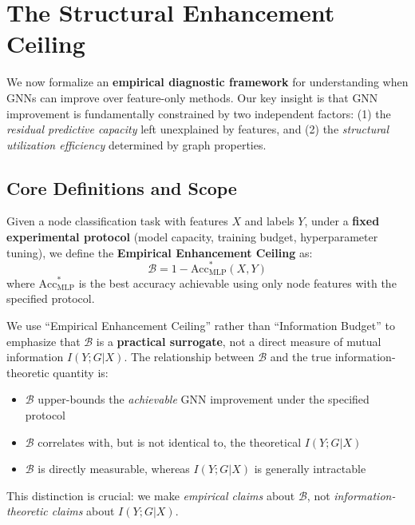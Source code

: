 
\section{The Structural Enhancement Ceiling}
\label{sec:budget}

We now formalize an \textbf{empirical diagnostic framework} for understanding when GNNs can improve over feature-only methods. Our key insight is that GNN improvement is fundamentally constrained by two independent factors: (1) the \textit{residual predictive capacity} left unexplained by features, and (2) the \textit{structural utilization efficiency} determined by graph properties.

\subsection{Core Definitions and Scope}

\begin{definition}
\label{def:budget}
Given a node classification task with features $X$ and labels $Y$, under a \textbf{fixed experimental protocol} (model capacity, training budget, hyperparameter tuning), we define the \textbf{Empirical Enhancement Ceiling} as:
\begin{equation}
    \mathcal{B} = 1 - \text{Acc}_{\text{MLP}}^*(X, Y)
\end{equation}
where $\text{Acc}_{\text{MLP}}^*$ is the best accuracy achievable using only node features with the specified protocol.
\end{definition}

\begin{remark}
\label{rem:terminology}
We use ``Empirical Enhancement Ceiling'' rather than ``Information Budget'' to emphasize that $\mathcal{B}$ is a \textbf{practical surrogate}, not a direct measure of mutual information $I(Y; G | X)$. The relationship between $\mathcal{B}$ and the true information-theoretic quantity is:
\begin{itemize}
    \item $\mathcal{B}$ upper-bounds the \textit{achievable} GNN improvement under the specified protocol
    \item $\mathcal{B}$ correlates with, but is not identical to, the theoretical $I(Y; G | X)$
    \item $\mathcal{B}$ is directly measurable, whereas $I(Y; G | X)$ is generally intractable
\end{itemize}
This distinction is crucial: we make \textit{empirical claims} about $\mathcal{B}$, not \textit{information-theoretic claims} about $I(Y; G | X)$.
\end{remark}

